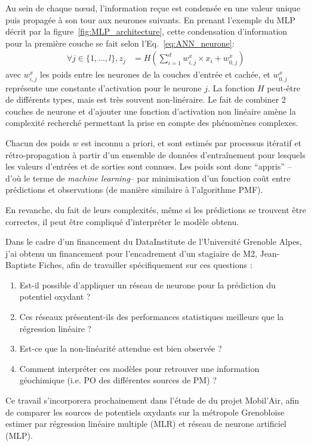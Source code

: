 Au sein de chaque nœud, l'information reçue est condensée en une valeur unique puis propagée à
son tour aux neurones suivants. En prenant l'exemple du MLP décrit par la
figure~\ref{fig:MLP_architecture}, cette condensation d'information pour la première
couche se fait selon l'Eq.~\ref{eq:ANN_neurone}:
\begin{align}
    \label{eq:ANN_neurone}
    \forall j \in \{1, ..., l\}, z_j &= H\left( \sum_{i=1}^d w^x_{i,j} \times x_i + w^x_{0,j} \right)
\end{align}
avec $w^x_{i,j}$ les poids entre les neurones de la couches d'entrée et cachée, et
$w^x_{0,j}$ représente une constante d'activation pour le neurone $j$. La fonction $H$
peut-être de différents types, mais est très souvent non-linéraire. Le fait de combiner 2
couches de neurone et d'ajouter une fonction d'activation non linéaire amène la
complexité recherché permettant la prise en compte des phénomènes complexes.

Chacun des poids $w$ est inconnu a priori, et sont estimés par processus itératif et
rétro-propagation à partir d'un ensemble de données d'entraînement pour lesquels les
valeurs d'entrées et de sorties sont connues. Les poids sont donc ``appris'' --d'où le
terme de \textit{machine learning}-- par minimisation d'un fonction coût entre prédictions
et observations (de manière similaire à l'algorithme PMF).

En revanche, du fait de leurs complexités, même si les prédictions se trouvent être
correctes, il peut être compliqué d'interpréter le modèle obtenu.


Dans le cadre d'un financement du DataInstitute de l'Université Grenoble Alpes, j'ai
obtenu un financement pour l'encadrement d'un stagiaire de M2, Jean-Baptiste Fiches, afin
de travailler spécifiquement sur ces questions :
\begin{enumerate}
    \item Est-il possible d'appliquer un réseau de neurone pour la prédiction du potentiel
        oxydant ?
    \item Ces réseaux présentent-ils des performances statistiques meilleurs que la
        régression linéaire ?
    \item Est-ce que la non-linéarité attendue est bien observée ?
    \item Comment interpréter ces modèles pour retrouver une information géochimique (i.e.
        PO des différentes sources de PM) ?
\end{enumerate}
Ce travail s'incorporera prochainement dans l'étude de \cite{borlazaUrbaninprep.} du
projet Mobil'Air, afin de comparer les sources de potentiels oxydants sur la
métropole Grenobloise estimer par régression linéaire multiple (MLR) et réseau de neurone
artificiel (MLP).


